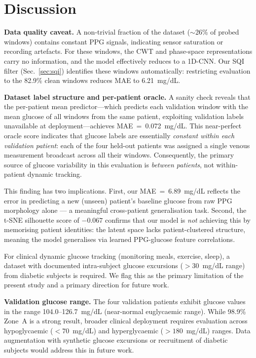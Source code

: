 \documentclass[conference]{IEEEtran}
\begin{document}
\section{Discussion}
\label{sec:discussion}

\textbf{Data quality caveat.}  A non-trivial fraction of the dataset
($\sim$26\% of probed windows) contains constant PPG signals, indicating
sensor saturation or recording artefacts.  For these windows, the CWT and
phase-space representations carry no information, and the model effectively
reduces to a 1D-CNN.  Our SQI filter (Sec.~\ref{sec:sqi}) identifies these
windows automatically: restricting evaluation to the 82.9\% clean windows
reduces MAE to 6.21~mg/dL.

\textbf{Dataset label structure and per-patient oracle.}
A sanity check reveals that the per-patient mean predictor---which predicts
each validation window with the mean glucose of all windows from the same
patient, exploiting validation labels unavailable at deployment---achieves
MAE~=~0.072~mg/dL.  This near-perfect oracle score indicates that glucose
labels are essentially \emph{constant within each validation patient}:
each of the four held-out patients was assigned a single venous measurement
broadcast across all their windows.  Consequently, the primary source of
glucose variability in this evaluation is \emph{between patients},
not within-patient dynamic tracking.

This finding has two implications.  First, our MAE~=~6.89~mg/dL reflects the
error in predicting a new (unseen) patient's baseline glucose from raw PPG
morphology alone --- a meaningful cross-patient generalisation task.
Second, the t-SNE silhouette score of $-0.067$ confirms that our model is
\emph{not} achieving this by memorising patient identities: the latent space
lacks patient-clustered structure, meaning the model generalises via
learned PPG-glucose feature correlations.

For clinical dynamic glucose tracking (monitoring meals, exercise, sleep), a
dataset with documented intra-subject glucose excursions ($>$30~mg/dL range)
from diabetic subjects is required.  We flag this as the primary limitation
of the present study and a primary direction for future work.

\textbf{Validation glucose range.}  The four validation patients exhibit
glucose values in the range 104.0--126.7~mg/dL (near-normal euglycaemic range).  While
98.9\% Zone~A is a strong result, broader clinical deployment requires
evaluation across hypoglycaemic ($<70$~mg/dL) and hyperglycaemic
($>180$~mg/dL) ranges.  Data augmentation with synthetic glucose excursions
or recruitment of diabetic subjects would address this in future work.
\end{document}
